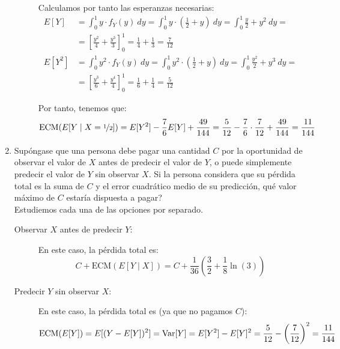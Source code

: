 \begin{ejercicio}
\begin{enumerate}
\begin{description}
            Calculamos por tanto las esperanzas necesarias:
            \begin{align*}
                E[Y] &= \int_{0}^{1} y\cdot f_Y(y) \ dy = \int_{0}^{1} y\cdot \left(\frac{1}{2}+y\right) \ dy
                = \int_{0}^{1} \frac{y}{2}+y^2 \ dy
                =\\&= \left[\frac{y^2}{4}+\frac{y^3}{3}\right]_{0}^{1}
                = \frac{1}{4}+\frac{1}{3} = \frac{7}{12}\\
                E[Y^2] &= \int_{0}^{1} y^2\cdot f_Y(y) \ dy = \int_{0}^{1} y^2\cdot \left(\frac{1}{2}+y\right) \ dy
                = \int_{0}^{1} \frac{y^2}{2}+y^3 \ dy
                =\\&= \left[\frac{y^3}{6}+\frac{y^4}{4}\right]_{0}^{1}
                = \frac{1}{6}+\frac{1}{4} = \frac{5}{12}
            \end{align*}

            Por tanto, tenemos que:
            \begin{align*}
                \text{ECM}(E[Y\mid X = \nicefrac{1}{2}]) &= E[Y^2]-\dfrac{7}{6}E[Y]+\dfrac{49}{144}
                = \frac{5}{12}-\dfrac{7}{6}\cdot \frac{7}{12}+\dfrac{49}{144}
                = \frac{11}{144}
            \end{align*}
        \end{description}

        \item Supóngase que una persona debe pagar una cantidad $C$ por la oportunidad de observar el valor de $X$ antes de predecir el valor de $Y$, o puede simplemente predecir el valor de $Y$ sin observar $X$. Si la persona considera que su pérdida total es la suma de $C$ y el error cuadrático medio de su predicción, qué valor máximo de $C$ estaría dispuesta a pagar?\\
        
        Estudiemos cada una de las opciones por separado.
        \begin{description}
            \item[Observar $X$ antes de predecir $Y$:] En este caso, la pérdida total es:
            \begin{equation*}
                C+\text{ECM}(E[Y\mid X]) = C + \dfrac{1}{36}\left(\dfrac{3}{2} + \dfrac{1}{8}\ln(3)\right)
            \end{equation*}

            \item[Predecir $Y$ sin observar $X$:] En este caso, la pérdida total es (ya que no pagamos $C$):
            \begin{equation*}
                \text{ECM}(E[Y]) = E[(Y-E[Y])^2] = \operatorname{Var}[Y]
                = E[Y^2]-E[Y]^2 = \dfrac{5}{12}-\left(\dfrac{7}{12}\right)^2
                = \dfrac{11}{144}
            \end{equation*}            
        \end{description}


\end{enumerate}
\end{ejercicio}
